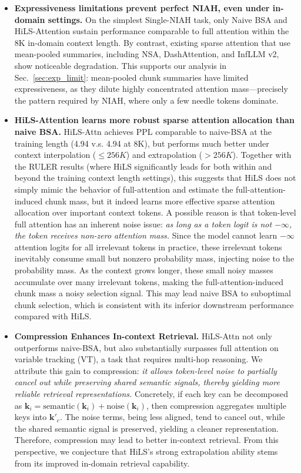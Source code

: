 \begin{itemize}[leftmargin=*,itemsep=0.2em,topsep=0.3em]
    \item \textbf{Expressiveness limitations prevent perfect NIAH, even under in-domain settings.} On the simplest Single-NIAH task, only Naive BSA and HiLS-Attention sustain performance comparable to full attention within the 8K in-domain context length. By contrast, existing sparse attention that use mean-pooled summaries, including NSA, DashAttention, and InfLLM v2, show noticeable degradation.
    This supports our analysis in Sec.~\ref{sec:exp_limit}: mean-pooled chunk summaries have limited expressiveness, as they dilute highly concentrated attention mass—precisely the pattern required by NIAH, where only a few needle tokens dominate.
    \item 
    \textbf{HiLS-Attention learns more robust sparse attention allocation than naive BSA.}
    HiLS-Attn achieves PPL comparable to naive-BSA at the training length (4.94 v.s. 4.94 at $8$K), but performs much better under context interpolation ($\leq 256K$) and extrapolation ($> 256K$).
    Together with the RULER results (where HiLS significantly leads for both within and beyond the training context length settings), this suggests that HiLS does not simply mimic the behavior of full-attention and estimate the full-attention-induced chunk mass, but it indeed learns more effective sparse attention allocation over important context tokens. A possible reason is that token-level full attention has an inherent noise issue: \textit{as long as a token logit is not $-\infty$, the token receives non-zero attention mass.} Since the model cannot learn $-\infty$ attention logits for all irrelevant tokens in practice, these irrelevant tokens inevitably consume small but nonzero probability mass, injecting noise to the probability mass. 
    As the context grows longer, these small noisy masses accumulate over many irrelevant tokens, making the full-attention-induced chunk mass a noisy selection signal. This may lead naive BSA to suboptimal chunk selection, which is consistent with its inferior downstream performance compared with HiLS.
    
    \item \textbf{Compression Enhances In-context Retrieval.}
    HiLS-Attn not only outperforms naive-BSA, but also substantially surpasses full attention on variable tracking (VT), a task that requires multi-hop reasoning. 
    We attribute this gain to compression: \textit{it allows token-level noise to partially cancel out while preserving shared semantic signals, thereby yielding more reliable retrieval representations.}
    Concretely, if each key can be decomposed as $\mathbf{k}_i=\mathrm{semantic}(\mathbf{k}_i)+\mathrm{noise}(\mathbf{k}_i)$, then compression aggregates multiple keys into $\mathbf{k}'_c$. The noise terms, being less aligned, tend to cancel out, while the shared semantic signal is preserved, yielding a cleaner representation. Therefore, compression may lead to better in-context retrieval. From this perspective, we conjecture that HiLS's strong extrapolation ability stems from its improved in-domain retrieval capability.


\end{itemize}

